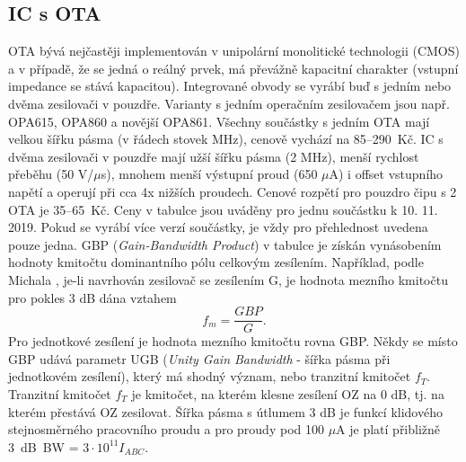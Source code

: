 \subsection{IC s OTA}
OTA bývá nejčastěji implementován v unipolární monolitické technologii (CMOS) a v případě, že se jedná o reálný prvek, má převážně kapacitní charakter (vstupní impedance se stává kapacitou). Integrované obvody se vyrábí buď s jedním nebo dvěma zesilovači v pouzdře. Varianty s jedním operačním zesilovačem jsou např. OPA615, OPA860 a novější OPA861. Všechny součástky s jedním OTA mají velkou šířku pásma (v řádech stovek MHz), cenově vychází na 85--290~Kč. IC s dvěma zesilovači v pouzdře mají užší šířku pásma (2 MHz), menší rychlost přeběhu (50 V/$\mu$s), mnohem menší výstupní proud (650 $\mu$A) i offset vstupního napětí a operují při cca 4x nižších proudech. Cenové rozpětí pro pouzdro čipu s 2 OTA je 35--65~Kč. Ceny v tabulce jsou uváděny pro jednu součástku k 10. 11. 2019. Pokud se vyrábí více verzí součástky, je vždy pro přehlednost uvedena pouze jedna. GBP (\textit{Gain-Bandwidth Product}) v tabulce je získán vynásobením hodnoty kmitočtu dominantního pólu celkovým zesílením. Například, podle Michala \cite{11}, je-li navrhován zesilovač se zesílením G, je hodnota mezního kmitočtu pro pokles 3 dB dána vztahem
\begin{equation}
f_m = \frac{GBP}{G}.
\end{equation}
\noindent Pro jednotkové zesílení je hodnota mezního kmitočtu rovna GBP. Někdy se místo GBP udává parametr UGB (\textit{Unity Gain Bandwidth} - šířka pásma při jednotkovém zesílení), který má shodný význam, nebo tranzitní kmitočet $f_T$. Tranzitní kmitočet $f_T$ je kmitočet, na kterém klesne zesílení OZ na 0 dB, tj. na kterém přestává OZ zesilovat. Šířka pásma s útlumem 3 dB je funkcí klidového stejnosměrného pracovního proudu a pro proudy pod 100 $\mu$A je platí přibližně 3~dB\ BW = $3 \cdot 10^{11} I_{ABC}$.
\renewcommand{\arraystretch}{1.5}

